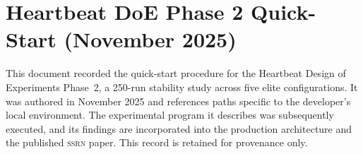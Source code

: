 
\section*{Heartbeat DoE Phase 2 Quick-Start (November 2025)}

This document recorded the quick-start procedure for the Heartbeat Design of
Experiments Phase~2, a 250-run stability study across five elite configurations.
It was authored in November 2025 and references paths specific to the developer's
local environment. The experimental program it describes was subsequently executed,
and its findings are incorporated into the production architecture and the
published \textsc{ssrn} paper. This record is retained for provenance only.
